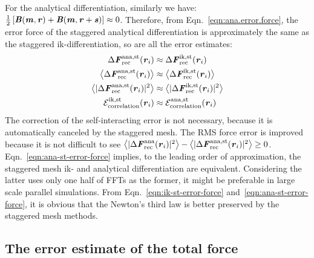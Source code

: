 \documentclass[aps,pre,preprint]{revtex4}
\renewcommand{\v}[1]{\textbf{\textit{#1}}}
\begin{document}
For the analytical differentiation, similarly we have: $\frac12\,[\v
B(\v m,\v r) + \v B(\v m, \v r+\v s)] \approx 0$. Therefore, from
Eqn.~\eqref{eqn:ana.error.force}, the error force of the staggered
analytical differentiation is approximately the same as the staggered
ik-differentiation, so are all the error estimates:
\begin{align}\label{eqn:ana-st-error-force}
  \Delta\v F^{\textrm{ana,st}}_{\textrm{rec}}(\v r_i)
  &\approx
  \Delta\v F^{\textrm{ik,st}}_{\textrm{rec}}(\v r_i)\\
  \big\langle
  \Delta\v F_{\textrm{rec}}^{\textrm{ana,st}}(\v r_i)
  \big\rangle
  &\approx
  \big\langle
  \Delta\v F_{\textrm{rec}}^{\textrm{ik,st}}(\v r_i)
  \big\rangle\\
  \big\langle
  \vert\Delta\v F_{\textrm{rec}}^{\textrm{ana,st}}(\v r_i)\vert^2
  \big\rangle
  &\approx
  \big\langle
  \vert\Delta\v F_{\textrm{rec}}^{\textrm{ik,st}}(\v r_i)\vert^2
  \big\rangle\\
  \mathcal E^{\textrm{ik,st}}_{\textrm{correlation}}(\v r_i)
  &\approx
  \mathcal E^{\textrm{ana,st}}_{\textrm{correlation}}(\v r_i)
\end{align}
The correction of the self-interacting error is not necessary,
because it is automatically canceled by the staggered mesh.
The RMS force error is improved because it is not
difficult to see 
$\big\langle\vert\Delta\v F_{\textrm{rec}}^{\textrm{ana}}(\v r_i)\vert^2\big\rangle -
\big\langle\vert\Delta\v F_{\textrm{rec}}^{\textrm{ana,st}}(\v r_i)\vert^2\big\rangle
\geq 0$.
Eqn.~\eqref{eqn:ana-st-error-force} implies, to the
leading order of approximation, the staggered
mesh ik- and analytical differentiation
are equivalent. Considering the latter uses
only one half of  FFTs as the former, it might be preferable
in large scale parallel simulations.
From Eqn.~\eqref{eqn:ik-st-error-force}
and~\eqref{eqn:ana-st-error-force}, it is obvious that the Newton's
third law is better preserved by the staggered mesh methods.



\subsection{The error estimate of the total force}
\end{document}
